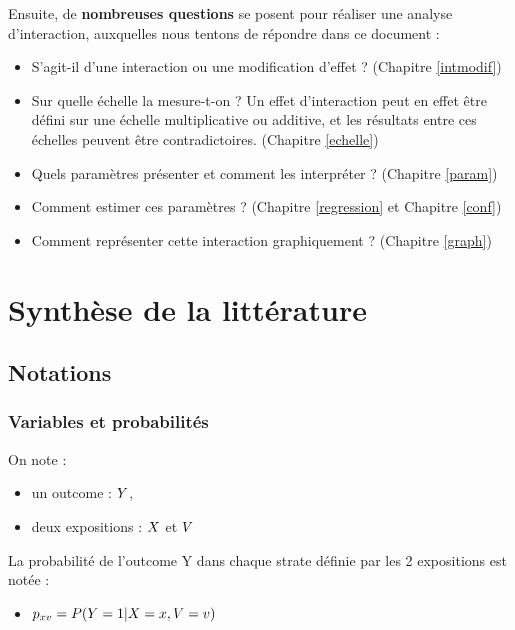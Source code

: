 \documentclass[
]{book}
\providecommand{\tightlist}{%
  \setlength{\itemsep}{0pt}\setlength{\parskip}{0pt}}
\begin{document}
Ensuite, de \textbf{nombreuses questions} se posent pour réaliser une analyse d'interaction, auxquelles nous tentons de répondre dans ce document :

\begin{itemize}
\tightlist
\item
  S'agit-il d'une interaction ou une modification d'effet ? (Chapitre \ref{intmodif})
\item
  Sur quelle échelle la mesure-t-on ? Un effet d'interaction peut en effet être défini sur une échelle multiplicative ou additive, et les résultats entre ces échelles peuvent être contradictoires. (Chapitre \ref{echelle})
\item
  Quels paramètres présenter et comment les interpréter ? (Chapitre \ref{param})
\item
  Comment estimer ces paramètres ? (Chapitre \ref{regression} et Chapitre \ref{conf})
\item
  Comment représenter cette interaction graphiquement ? (Chapitre \ref{graph})
\end{itemize}

\hypertarget{part-synthuxe8se-de-la-littuxe9rature}{%
\part{Synthèse de la littérature}\label{part-synthuxe8se-de-la-littuxe9rature}}

\hypertarget{notations}{%
\chapter{Notations}\label{notations}}

\hypertarget{variables-et-probabilituxe9s}{%
\section{Variables et probabilités}\label{variables-et-probabilituxe9s}}

On note :

\begin{itemize}
\tightlist
\item
  un outcome : \(\small Y\),
\item
  deux expositions : \(\small X\) et \(\small V\)
\end{itemize}

La probabilité de l'outcome Y dans chaque strate définie par les 2 expositions est notée :

\begin{itemize}
\tightlist
\item
  \(\small p_{xv} = P(Y = 1|X = x,V = v)\)
\end{itemize}
\end{document}
